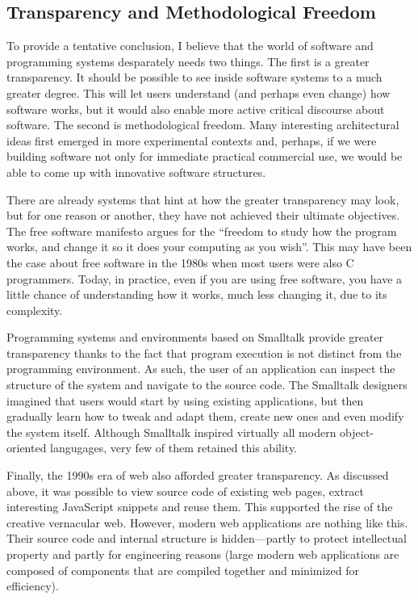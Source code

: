 \subsection{Transparency and Methodological Freedom}

To provide a tentative conclusion, I believe that the world of software and programming systems
desparately needs two things. The first is a greater transparency. It should be possible to see
inside software systems to a much greater degree. This will let users understand (and perhaps
even change) how software works, but it would also enable more active critical discourse
about software. The second is methodological freedom. Many interesting architectural ideas
first emerged in more experimental contexts and, perhaps, if we were building software not
only for immediate practical commercial use, we would be able to come up with innovative software
structures.

There are already systems that hint at how the greater transparency may look, but for one reason
or another, they have not achieved their ultimate objectives. The free software manifesto argues
for the ``freedom to study how the program works, and change it so it does your computing as you
wish''. This may have been the case about free software in the 1980s when
most users were also C programmers. Today, in practice, even if you are using free software,
you have a little chance of understanding how it works, much less changing it, due to its
complexity.

Programming systems and environments based on Smalltalk provide greater transparency thanks to
the fact that program execution is not distinct from the programming environment. As such, the
user of an application can inspect the structure of the system and navigate to the source code.
The Smalltalk designers imagined that users would start by using existing applications, but then
gradually learn how to tweak and adapt them, create new ones and even modify the system
itself.
Although Smalltalk inspired virtually all modern object-oriented langugages, very few of them
retained this ability.

Finally, the 1990s era of web also afforded greater transparency. As discussed above, it was
possible to view source code of existing web pages, extract interesting JavaScript snippets and
reuse them. This supported the rise of the creative vernacular web. However, modern web applications
are nothing like this. Their source code and internal structure is hidden---partly to protect
intellectual property and partly for engineering reasons (large modern web applications are
composed of components that are compiled together and minimized for efficiency).

